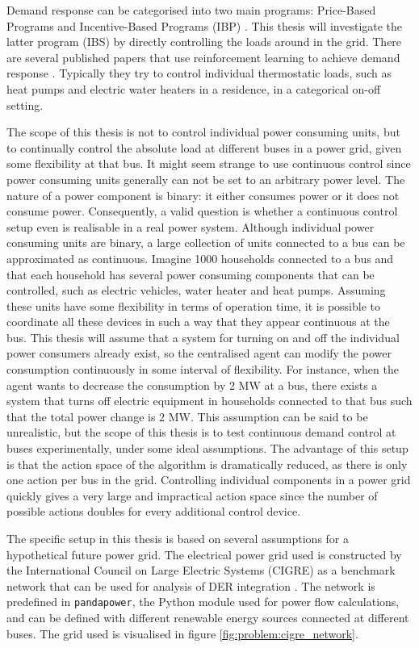 \documentclass[class=book, crop=false]{standalone}
\begin{document}
Demand response can be categorised into two main programs: Price-Based Programs and Incentive-Based Programs (IBP) \cite{demand_response_definition}. This thesis will investigate the latter program (IBS) by directly controlling the loads around in the grid. There are several published papers that use reinforcement learning to achieve demand response \cite{active_network_management}. Typically they try to control individual thermostatic loads, such as heat pumps and electric water heaters in a residence, in a categorical on-off setting.

The scope of this thesis is not to control individual power consuming units, but to continually control the absolute load at different buses in a power grid, given some flexibility at that bus. It might seem strange to use continuous control since power consuming units generally can not be set to an arbitrary power level. The nature of a power component is binary: it either consumes power or it does not consume power. Consequently, a valid question is whether a continuous control setup even is realisable in a real power system. Although individual power consuming units are binary, a large collection of units connected to a bus can be approximated as continuous. Imagine 1000 households connected to a bus and that each household has several power consuming components that can be controlled, such as electric vehicles, water heater and heat pumps. Assuming these units have some flexibility in terms of operation time, it is possible to coordinate all these devices in such a way that they appear continuous at the bus. This thesis will assume that a system for turning on and off the individual power consumers already exist, so the centralised agent can modify the power consumption continuously in some interval of flexibility. For instance, when the agent wants to decrease the consumption by 2 MW at a bus, there exists a system that turns off electric equipment in households connected to that bus such that the total power change is 2 MW. This assumption can be said to be unrealistic, but the scope of this thesis is to test continuous demand control at buses experimentally, under some ideal assumptions. The advantage of this setup is that the action space of the algorithm is dramatically reduced, as there is only one action per bus in the grid. Controlling individual components in a power grid quickly gives a very large and impractical action space since the number of possible actions doubles for every additional control device.

The specific setup in this thesis is based on several assumptions for a hypothetical future power grid. The electrical power grid used is constructed by the International Council on Large Electric Systems (CIGRE) as a benchmark network that can be used for analysis of DER integration \cite{cigre}. The network is predefined in \texttt{pandapower}, the Python module used for power flow calculations, and can be defined with different renewable energy sources connected at different buses. The grid used is visualised in figure \ref{fig:problem:cigre_network}. 
\end{document}
